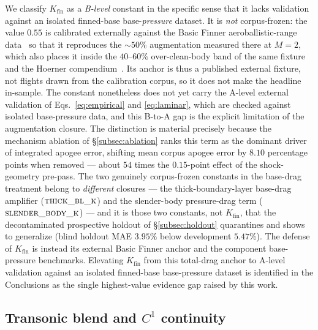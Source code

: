 We classify $K_{\text{fin}}$ as a \emph{B-level} constant in the specific sense
that it lacks validation against an isolated finned-base base-\emph{pressure}
dataset. It is \emph{not} corpus-frozen: the value $0.55$ is calibrated
externally against the Basic Finner aeroballistic-range data~\cite{dupuis1997}
so that it reproduces the $\sim\!50\%$ augmentation measured there at $M = 2$,
which also places it inside the $40$--$60\%$ over-clean-body band of the same
fixture and the Hoerner compendium~\cite{hoerner1965}. Its anchor is thus a
published external fixture, not flights drawn from the calibration corpus, so it
does not make the headline in-sample. The constant nonetheless does not yet carry
the A-level external validation of Eqs.~\eqref{eq:empirical} and
\eqref{eq:laminar}, which are checked against isolated base-pressure data, and
this B-to-A gap is the explicit limitation of the augmentation closure. The
distinction is material precisely because the mechanism ablation of
\S\ref{subsec:ablation} ranks this term as the dominant driver of integrated
apogee error, shifting mean corpus apogee error by $8.10$ percentage points when
removed --- about $54$ times the $0.15$-point effect of the
shock-geometry pre-pass. The two genuinely corpus-frozen constants in the
base-drag treatment belong to \emph{different} closures --- the
thick-boundary-layer base-drag amplifier ($\textsc{thick\_bl\_k}$) and the
slender-body pressure-drag term ($\textsc{slender\_body\_k}$) --- and it is those
two constants, not $K_{\text{fin}}$, that the decontaminated prospective holdout
of \S\ref{subsec:holdout} quarantines and shows to generalize (blind holdout MAE
$3.95\%$ below development $5.47\%$). The defense of $K_{\text{fin}}$ is instead
its external Basic Finner anchor and the component base-pressure benchmarks.
Elevating $K_{\text{fin}}$ from this total-drag anchor to A-level validation
against an isolated finned-base base-pressure dataset is identified in the
Conclusions as the single highest-value evidence gap raised by this work.

\subsection{Transonic blend and $C^{1}$ continuity}
\label{subsec:transonic}

